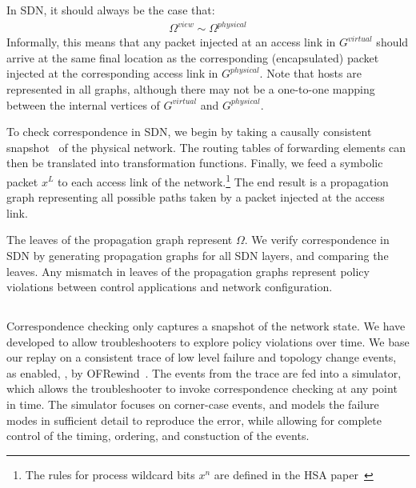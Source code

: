 In SDN, it should always be the case that:
\begin{align*}
\Omega^{view} \sim \Omega^{physical}
\end{align*}
Informally, this means that any packet injected at an access link in $G^{virtual}$ should arrive at
the same final location as the corresponding (encapsulated) packet injected at the
corresponding access link in $G^{physical}$. Note that hosts are represented
in all graphs, although there may not be a one-to-one mapping between the
internal vertices of $G^{virtual}$ and $G^{physical}$.

To check correspondence in SDN, we begin by taking a causally consistent
snapshot~\cite{Chandy:1985:DSD:214451.214456} of the physical network.
 The routing
tables of forwarding elements can then be translated into transformation functions.
Finally, we feed a symbolic packet $x^L$ to each access link of the
network.\footnote{The rules for process wildcard bits $x^n$ are defined in
the HSA paper~\cite{hsa}} The end result is a propagation graph representing all possible paths taken by a packet injected
at the access link.

The leaves of the propagation graph represent $\Omega$. We
verify correspondence in SDN by generating propagation graphs for all SDN layers,
and comparing the leaves. Any mismatch in leaves of the propagation graphs
represent policy violations between control applications and network
configuration.

\subsection{\SIMULATOR{}}

Correspondence checking only captures a snapshot of the network state.
We have developed \simulator{} to allow troubleshooters to explore
policy violations over time. We base our replay on a consistent
trace of low level failure and topology change events, as enabled,
\eg{}, by OFRewind~\cite{ofrewind}. 
The events from the trace are fed into a simulator, which allows the
troubleshooter to invoke correspondence
checking at any point in time. The simulator focuses on corner-case events,
and models the failure modes in sufficient detail to reproduce the error, while
allowing for complete control of the timing, ordering, and constuction of the events.


